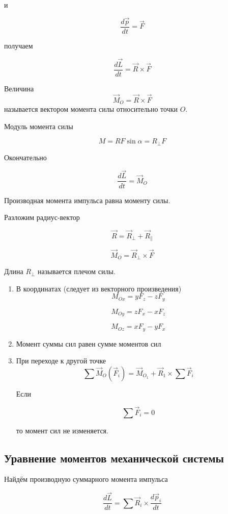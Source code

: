\documentclass[a4paper,12pt]{article}
\begin{document}
и

\[
\frac{d\vec p}{dt} = \vec F
\]

получаем

\[
\frac{d\vec L}{dt}
=
\vec R \times \vec F
\]

\begin{definitionbox}
Величина
\[
\vec M_O = \vec R \times \vec F
\]
называется вектором момента силы относительно точки $O$.
\end{definitionbox}

Модуль момента силы

\[
M = RF \sin \alpha = R_{\perp}F
\]

Окончательно

\[
\frac{d\vec L}{dt}
=
\vec M_O
\]

\begin{theorembox}
Производная момента импульса равна моменту силы.
\end{theorembox}


Разложим радиус-вектор

\[
\vec R = \vec R_{\perp} + \vec R_{\parallel}
\]

\[
\vec M_O = \vec R_{\perp} \times \vec F
\]

Длина $R_{\perp}$ называется плечом силы.

\begin{enumerate}
    \item В координатах (следует из векторного произведения)
\[
M_{Ox} = yF_z - zF_y
\]

\[
M_{Oy} = zF_x - xF_z
\]

\[
M_{Oz} = xF_y - yF_x
\]
    \item Момент суммы сил равен сумме моментов сил
    \item При переходе к другой точке
    \[
    \sum \vec M_O(\vec F_i)
    =
    \vec M_{O_1}
    +
    \vec R_1 \times \sum \vec F_i
    \]

    Если

    \[
    \sum \vec F_i = 0
    \]

    то момент сил не изменяется.
\end{enumerate} 

\subsection*{Уравнение моментов механической системы}

Найдём производную суммарного момента импульса

\[
\frac{d\vec L}{dt}
=
\sum \vec R_i \times \frac{d\vec p_i}{dt}
\]
\end{document}
